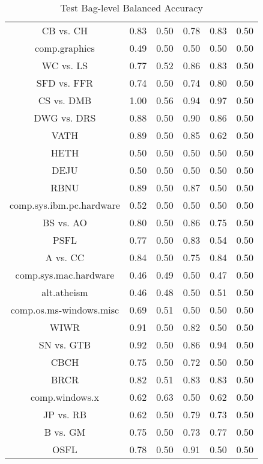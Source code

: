 \begin{table}[ht]\footnotesize
\centering
\caption{Test Bag-level Balanced Accuracy}
\label{Table:mil_test_bag_balanced_accuracy}
\begin{tabular}{|c|c|c|c|c|c|}
  \hline
          &\MIB{}  &  \rB{}  &  \MB{}  &  \AB{}  &  \AuerB{}\\ 
  \hline
CB vs. CH  &  0.83   &  0.50   &  0.78   &  0.83   &  0.50 \\ 
comp.graphics  &  0.49   &  0.50   &  0.50   &  0.50   &  0.50 \\ 
WC vs. LS  &  0.77   &  0.52   &  0.86   &  0.83   &  0.50 \\ 
SFD vs. FFR  &  0.74   &  0.50   &  0.74   &  0.80   &  0.50 \\ 
CS vs. DMB  &  1.00   &  0.56   &  0.94   &  0.97   &  0.50 \\ 
DWG vs. DRS  &  0.88   &  0.50   &  0.90   &  0.86   &  0.50 \\ 
VATH  &  0.89   &  0.50   &  0.85   &  0.62   &  0.50 \\ 
HETH  &  0.50   &  0.50   &  0.50   &  0.50   &  0.50 \\ 
DEJU  &  0.50   &  0.50   &  0.50   &  0.50   &  0.50 \\ 
RBNU  &  0.89   &  0.50   &  0.87   &  0.50   &  0.50 \\ 
comp.sys.ibm.pc.hardware  &  0.52   &  0.50   &  0.50   &  0.50   &  0.50 \\ 
BS vs. AO  &  0.80   &  0.50   &  0.86   &  0.75   &  0.50 \\ 
PSFL  &  0.77   &  0.50   &  0.83   &  0.54   &  0.50 \\ 
A vs. CC  &  0.84   &  0.50   &  0.75   &  0.84   &  0.50 \\ 
comp.sys.mac.hardware  &  0.46   &  0.49   &  0.50   &  0.47   &  0.50 \\ 
alt.atheism  &  0.46   &  0.48   &  0.50   &  0.51   &  0.50 \\ 
comp.os.ms-windows.misc  &  0.69   &  0.51   &  0.50   &  0.50   &  0.50 \\ 
WIWR  &  0.91   &  0.50   &  0.82   &  0.50   &  0.50 \\ 
SN vs. GTB  &  0.92   &  0.50   &  0.86   &  0.94   &  0.50 \\ 
CBCH  &  0.75   &  0.50   &  0.72   &  0.50   &  0.50 \\ 
BRCR  &  0.82   &  0.51   &  0.83   &  0.83   &  0.50 \\ 
comp.windows.x  &  0.62   &  0.63   &  0.50   &  0.62   &  0.50 \\ 
JP vs. RB  &  0.62   &  0.50   &  0.79   &  0.73   &  0.50 \\ 
B vs. GM  &  0.75   &  0.50   &  0.73   &  0.77   &  0.50 \\ 
OSFL  &  0.78   &  0.50   &  0.91   &  0.50   &  0.50 \\ 
\hline
 \end{tabular}
  \end{table}


